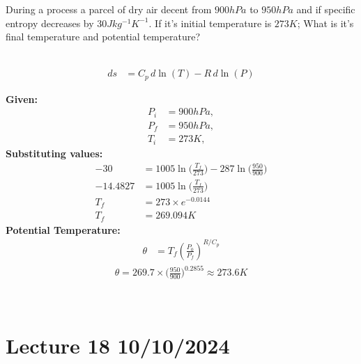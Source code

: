 \documentclass[fleqn,10pt]{SelfArx} %
\begin{document}
\begin{question}[\label=17.1]{During a process a parcel of dry air decent from $900hPa$ to $950hPa$ and if specific entropy decreases by $30Jkg^{-1}K^{-1}$. If it's initial temperature is $273K$; What is it's final temperature and potential temperature?}
\Rightarrow {} \\  \\ 

    \begin{align*}
        ds &= C_p \, d\ln(T) - R \, d\ln(P)
    \end{align*}

    \textbf{Given:}
    \begin{align*}
        P_i&=900hPa, \\
        P_f&=950hPa, \\
        T_i&=273K,
    \end{align*}
    \textbf{Substituting values:}
    \begin{align*}
        -30&=1005 \ln\Big(\frac{T_f}{273}\Big) - 287 \ln\Big(\frac{950}{900}\Big) \\
        -14.4827&=1005 \ln\Big(\frac{T_f}{273}\Big) \\
        T_f&=273 \times e^{-0.0144} \\
        T_f&=269.094K
    \end{align*}
    \textbf{Potential Temperature:}
    \begin{align*}
        \theta &= T_f \left(\frac{P_0}{P_f}\right)^{R/C_p}
    \end{align*}
    \begin{align*}
        \theta = 269.7 \times \Big(\frac{950}{900}\Big)^{0.2855} \approx 273.6K
    \end{align*}

\therefore {}\\ 
\end{question}

\clearpage

\section{Lecture 18 10/10/2024}
\end{document}
